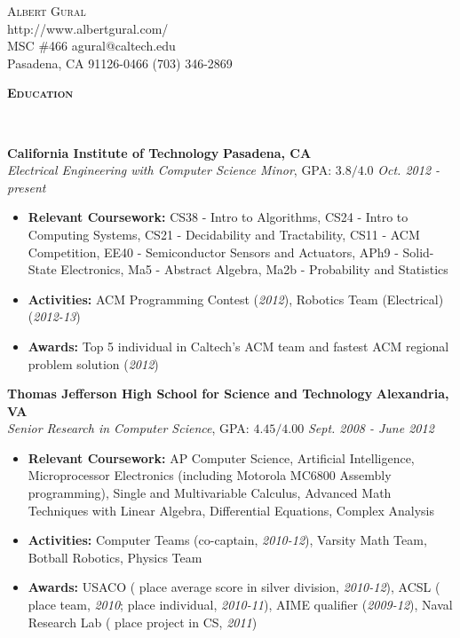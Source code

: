 \documentclass{article}
\newenvironment{changemargin}[2]{%
  \begin{list}{}{%
    \setlength{\topsep}{0pt}%
    \setlength{\leftmargin}{#1}%
    \setlength{\rightmargin}{#2}%
    \setlength{\listparindent}{\parindent}%
    \setlength{\itemindent}{\parindent}%
    \setlength{\parsep}{\parskip}%
  }%
  \item[]}{\end{list}
}
\newcommand{\lineover}{
	\begin{changemargin}{-0.05in}{-0.05in}
		\vspace*{-8pt}
		\hrulefill \\
		\vspace*{-2pt}
	\end{changemargin}
}
\newcommand{\header}[1]{
	\begin{changemargin}{-0.5in}{-0.5in}
		{\large \textbf{\scshape{#1}}}\\
  	\lineover
	\end{changemargin}
}
\newcommand{\contact}[6]{
	\begin{changemargin}{1in}{1in}
		\begin{center}
			{\LARGE \scshape {#1}}\\ \smallskip
			{#4}\\ \smallskip
			{#2} \hfill {#5}\\ \smallskip
			{#3} \hfill {#6}\\ \smallskip 
		\end{center}
	\end{changemargin}
}
\newenvironment{body} {
	\vspace*{-16pt}
	\begin{changemargin}{-0.25in}{-0.5in}
  }	
	{\end{changemargin}
}
\begin{document}
\contact{Albert Gural}{MSC \#466}{Pasadena, CA 91126-0466}{http://www.albertgural.com/}{agural@caltech.edu}{(703) 346-2869}


\header{Education}

\begin{body}
	\vspace{14pt}
	\textbf{California Institute of Technology} \hfill \textbf{Pasadena, CA}{} \\
	\emph{Electrical Engineering with Computer Science Minor}, GPA: $3.8/4.0$ \hfill \emph{Oct. 2012 - present} \\
	\begin{itemize}%
	\item \textbf{Relevant Coursework:} CS38 - Intro to Algorithms, CS24 - Intro to Computing Systems, CS21 - Decidability and Tractability, CS11 - ACM Competition, EE40 - Semiconductor Sensors and Actuators, APh9 - Solid-State Electronics, Ma5 - Abstract Algebra, Ma2b - Probability and Statistics
	\item \textbf{Activities:} ACM Programming Contest (\textit{2012}), Robotics Team (Electrical) (\textit{2012-13})
	\item \textbf{Awards:} Top 5 individual in Caltech's ACM team and fastest ACM regional problem solution (\textit{2012})
	\end{itemize}

	\medskip

	\textbf{Thomas Jefferson High School for Science and Technology} \hfill \textbf{Alexandria, VA} \\
	\emph{Senior Research in Computer Science}, GPA: $4.45/4.00$ \hfill \emph{Sept. 2008 - June 2012} \\
	\begin{itemize}%
	\item \textbf{Relevant Coursework:} AP Computer Science, Artificial Intelligence, Microprocessor Electronics (including Motorola MC6800 Assembly programming), Single and Multivariable Calculus, Advanced Math Techniques with Linear Algebra, Differential Equations, Complex Analysis
	\item \textbf{Activities:} Computer Teams (co-captain, \textit{2010-12}), Varsity Math Team, Botball Robotics, Physics Team
	\item \textbf{Awards:} USACO ( place average score in silver division, \textit{2010-12}), ACSL ( place team, \textit{2010};  place individual, \textit{2010-11}), AIME qualifier (\textit{2009-12}), Naval Research Lab ( place project in CS, \textit{2011})
	\end{itemize}
\end{body}
\end{document}

